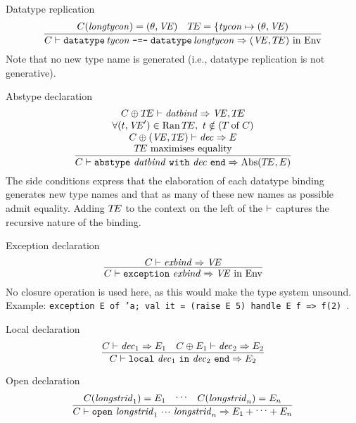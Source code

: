 \begin{sml-rule}{Datatype replication}
\begin{equation}\label{rule:static-core:datatype-replication}
  \vcenter{\infer{\C\ts\datatyperepldec\ra(\VE,\TE)\ \In\ \Env}
    {\C(\longtycon) = (\typefcn,\VE)
      & \TE=\{\tycon\mapsto(\typefcn,\VE)}}
\end{equation}
Note that no new type name is generated (i.e., datatype replication is
not generative).
\end{sml-rule}

\begin{sml-rule}{Abstype declaration}
\begin{equation}\label{rule:static-core:abstype-declaration}
  \vcenter{\infer{\C\ts\abstypedec\ra\Abs(\TE,\E)}
    {\deduce{\mbox{$\TE$ maximises equality}}
      {\deduce{\C\oplus(\VE,\TE)\ts\dec\ra\E}
        {\deduce{\forall(\t,\VE')\in\Ran\TE,\ \t\notin(\of{\T}{\C})}
          {\C\oplus\TE\ts\datbind\ra\VE,\TE}}}}}
\end{equation}
The side conditions express that the elaboration of each datatype
binding generates new type names and that as many of these new names as
possible admit equality.  Adding $\mbox{$T\!E$}$ to the context on the left of the
$\vdash$ captures the recursive nature of the binding.
\end{sml-rule}

\begin{sml-rule}{Exception declaration}
\begin{equation}\label{rule:static-core:exception-declaration}
  \vcenter{\infer{\C\ts\exceptiondec\ra\VE\ \In\ \Env}
    {\C\ts\exnbind\ra\VE}}
\end{equation}
No closure operation is used here, as this would make the type system unsound.
Example: {\tt exception E of 'a; val it = (raise E 5) handle E f => f(2)}~.
\end{sml-rule}

\begin{sml-rule}{Local declaration}
\begin{equation}\label{rule:static-core:local-declaration}
  \vcenter{\infer{\C\ts\localdec\ra\E_{2}}
    {\C\ts\dec_{1}\ra\E_{1}
      & \C\oplus\E_{1}\ts\dec_{2}\ra\E_{2}}}
\end{equation}
\end{sml-rule}

\begin{sml-rule}{Open declaration}
\begin{equation}\label{rule:static-core:open-declaration}
  \vcenter{\infer{\C\ts\openstrdec\ra \E_{1} + \syndots + \E_{n}}
    {\C(\longstrid_{1})= \E_{1} 
      & \syndots
      & \C(\longstrid_{n})= \E_{n}}}
\end{equation}
\end{sml-rule}

